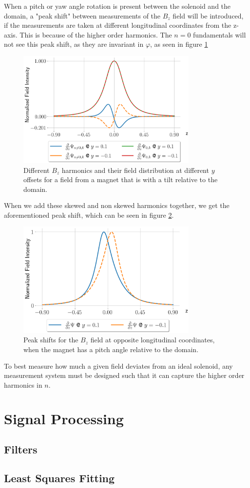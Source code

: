 When a pitch or yaw angle rotation is present between the solenoid and 
the domain, a "peak shift" between measurements of the $B_z$
field will be introduced, if the measurements are taken at
different longitudinal coordinates from the z-axis.
This is because of the higher order harmonics. The $n=0$ fundamentals will
not see this peak shift, as they are invariant in $\varphi$,
as seen in figure \ref{fig:harmonicsskew}
\begin{figure}[!h]
    \centering
    \includegraphics[width=0.8\textwidth]{figs/harmonicsskew.png}
    \caption{Different $B_z$ harmonics and their field distribution at
    different $y$ offsets for a field from a magnet that is with a tilt
    relative to the domain.}
    \label{fig:harmonicsskew}
\end{figure}

When we add these skewed and non skewed harmonics together, we get the 
aforementioned peak shift, which can be seen in figure \ref{fig:mirrored}.

\begin{figure}[!h]
    \centering
    \includegraphics[width=0.8\textwidth]{figs/mirrored}
    \caption{Peak shifts for the $B_z$ field at opposite longitudinal
    coordinates, when the magnet has a pitch angle relative
    to the domain.}
    \label{fig:mirrored}
\end{figure}

To best measure how much a given field deviates from an ideal solenoid,
any measurement system must be designed such that it can capture the
higher order harmonics in $n$. 

\newpage
\section{Signal Processing}
\subsection{Filters}
\subsection{Least Squares Fitting}